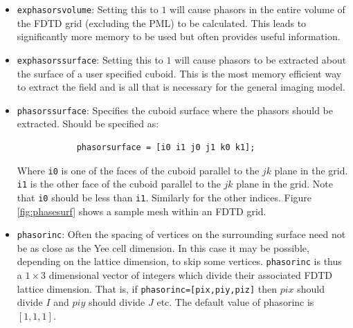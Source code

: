 \documentclass[a4paper, 12pt]{article}
\begin{document}
\begin{itemize}
		\item \verb+exphasorsvolume+: Setting this to $1$ will cause phasors
		in the entire volume of the FDTD grid (excluding the PML) to be
		calculated. This leads to significantly more memory to be used but
		often provides useful information.
		\item \verb+exphasorssurface+: Setting this to $1$ will cause phasors
		to be extracted about the surface of a user specified cuboid. This
		is the most memory efficient way to extract the field and is all
		that is necessary for the general imaging model. 
		\item \verb+phasorssurface+: Specifies the cuboid surface where the phasors
		should be extracted. Should be specified as:
		\begin{verbatim}
			phasorsurface = [i0 i1 j0 j1 k0 k1];
		\end{verbatim}
		Where \verb+i0+ is one of the faces of the cuboid parallel to the $jk$
		plane in the grid. \verb+i1+ is the other face of the cuboid parallel to the $jk$
		plane in the grid. Note that \verb+i0+ should be less than
		\verb+i1+. Similarly for the other indices. Figure \ref{fig:phasesurf}
		shows a sample mesh within an FDTD grid.
		\item \verb+phasorinc+: Often the spacing of vertices on the
		surrounding surface need not be as close as the Yee cell
		dimension. In this case it may be possible, depending on the lattice
		dimension, to skip some vertices. \verb+phasorinc+ is thus a
		$1\times 3$ dimensional vector of integers which divide their
		associated FDTD lattice dimension. That is, if
		\verb+phasorinc=[pix,piy,piz]+ then $pix$ should divide $I$ and
		$piy$ should divide $J$ etc. The default value of phasorinc is $[1,1,1]$.
		

\end{itemize}
\end{document}
